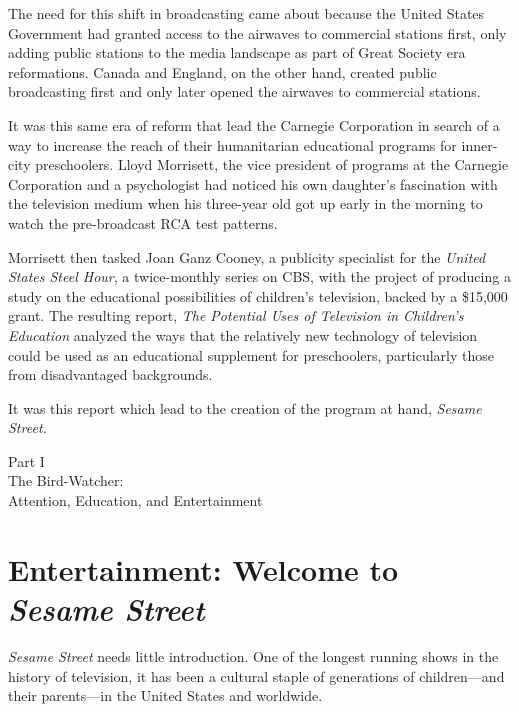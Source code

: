 \documentclass[12pt,letterpaper]{article}
\begin{document}
	The need for this shift in broadcasting came about because the
	United States Government had granted access to the airwaves to 
	commercial stations
	first, only adding public stations to the media landscape as part of
	Great Society era reformations. Canada and England, on the other
	hand, created public broadcasting first and only later opened the
	airwaves to commercial stations.\autocite[412]{Meany}

	It was this same era of reform that lead the Carnegie Corporation
	in search of a way to increase the reach of their 
	humanitarian educational programs for inner-city preschoolers.
	\autocite[15]{Davis} Lloyd Morrisett, the vice president of programs at
	the Carnegie Corporation\autocite[7]{Cooney} and a psychologist
	\autocite[15]{Davis} had noticed his own daughter's fascination with
	the television medium when his three-year old got up early in the 
	morning to watch the pre-broadcast RCA test patterns.
	\autocite[11]{Davis}
	
	Morrisett then tasked Joan Ganz Cooney, a publicity specialist for the 
	\textit{United States Steel Hour}, a twice-monthly series on CBS, 
	\autocite[27]{Davis} with the project of producing a study
	on the educational possibilities of children's television, backed by a
	\$15,000 grant. The resulting report, \textit{The Potential Uses of 
	Television in Children's Education} analyzed the ways that the
	relatively new technology of television could be used as an educational
	supplement for preschoolers, particularly those from disadvantaged 
	backgrounds.

	It was this report which lead to the creation of the program at hand, 
	\textit{Sesame Street.}


	\newpage
	\thispagestyle{empty}
	\vspace*{30pt}
	\begin{center}
	{\Huge Part I\\ 
	\Large The Bird-Watcher:\\
	Attention, Education, and Entertainment}
	\end{center}
	\newpage

	\section*{Entertainment: Welcome to \textit{Sesame Street}}

	\noindent\textit{Sesame Street} needs little introduction. One of the
	longest
	running shows in the history of television,\autocite{Brit} it has been a 
	cultural staple of generations of children---and their parents---in the 
	United States and worldwide.
	
\end{document}
